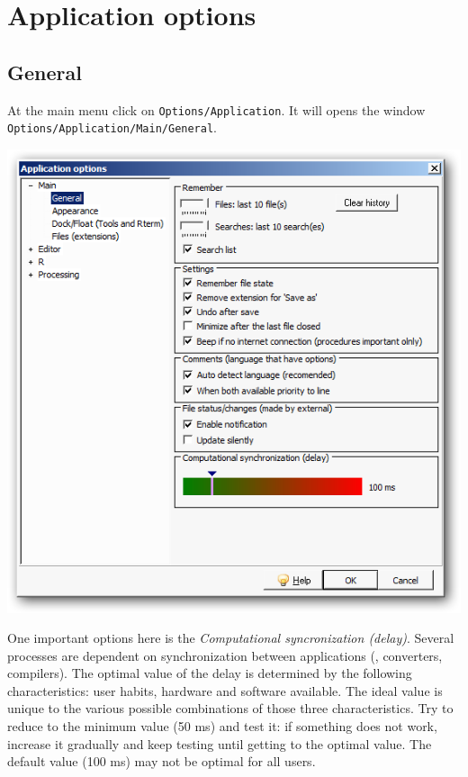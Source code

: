 
\section{Application options}
\subsection{General}

At the main menu click on \texttt{Options/Application}.
It will opens the window \texttt{Options/Application/Main/General}.

\includegraphics[scale=0.50]{./res/app_main_general.png}

One important options here is the \textit{Computational syncronization (delay)}.
Several processes are dependent on synchronization between applications
(\RR{}, converters, compilers). The optimal value of the delay is determined by the following characteristics:
user habits, hardware and software available.
The ideal value is unique to the various possible combinations of those three characteristics.
Try to reduce to the minimum value (50 ms) and test it: if something does not work, increase it gradually
and keep testing until getting to the optimal value. The default value (100 ms) may not be optimal for all users.


